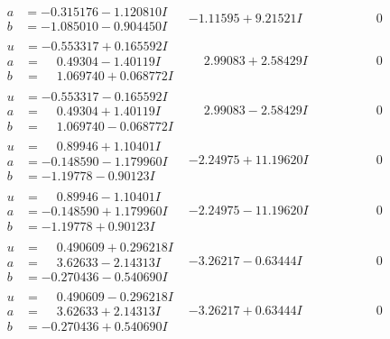 \documentclass[1p]{elsarticle_modified}
\theoremstyle{definition}
\begin{document}
$$\begin{array}{c|c|c}
\begin{aligned}
a &= -0.315176 - 1.120810 I \\
b &= -1.085010 - 0.904450 I\end{aligned}
 & -1.11595 + 9.21521 I & \phantom{-0.000000 } 0 \\ \hline\begin{aligned}
u &= -0.553317 + 0.165592 I \\
a &= \phantom{-}0.49304 - 1.40119 I \\
b &= \phantom{-}1.069740 + 0.068772 I\end{aligned}
 & \phantom{-}2.99083 + 2.58429 I & \phantom{-0.000000 } 0 \\ \hline\begin{aligned}
u &= -0.553317 - 0.165592 I \\
a &= \phantom{-}0.49304 + 1.40119 I \\
b &= \phantom{-}1.069740 - 0.068772 I\end{aligned}
 & \phantom{-}2.99083 - 2.58429 I & \phantom{-0.000000 } 0 \\ \hline\begin{aligned}
u &= \phantom{-}0.89946 + 1.10401 I \\
a &= -0.148590 - 1.179960 I \\
b &= -1.19778 - 0.90123 I\end{aligned}
 & -2.24975 + 11.19620 I & \phantom{-0.000000 } 0 \\ \hline\begin{aligned}
u &= \phantom{-}0.89946 - 1.10401 I \\
a &= -0.148590 + 1.179960 I \\
b &= -1.19778 + 0.90123 I\end{aligned}
 & -2.24975 - 11.19620 I & \phantom{-0.000000 } 0 \\ \hline\begin{aligned}
u &= \phantom{-}0.490609 + 0.296218 I \\
a &= \phantom{-}3.62633 - 2.14313 I \\
b &= -0.270436 - 0.540690 I\end{aligned}
 & -3.26217 - 0.63444 I & \phantom{-0.000000 } 0 \\ \hline\begin{aligned}
u &= \phantom{-}0.490609 - 0.296218 I \\
a &= \phantom{-}3.62633 + 2.14313 I \\
b &= -0.270436 + 0.540690 I\end{aligned}
 & -3.26217 + 0.63444 I & \phantom{-0.000000 } 0 \\ \hline\begin{aligned}

\end{aligned}
\end{array}$$
\end{document}
